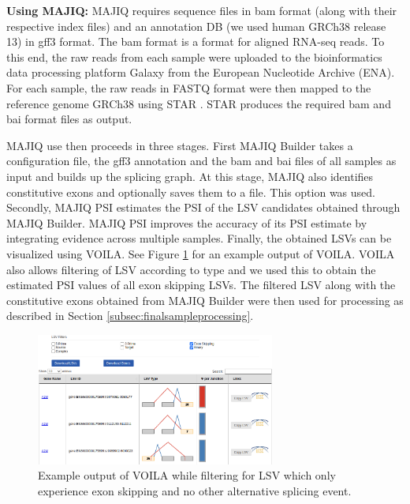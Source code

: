 \textbf{Using MAJIQ:} MAJIQ requires sequence files in bam format (along with their respective index files) and an annotation DB (we used human GRCh38 release 13) in gff3 format. The bam format is a format for aligned RNA-seq reads. 
To this end, the raw reads from each sample were uploaded to the bioinformatics data processing platform Galaxy \cite{galaxy} from the European Nucleotide Archive (ENA). For each sample, the raw reads in FASTQ format were then mapped to the reference genome GRCh38 \cite{hg38} using STAR \cite{star}. STAR produces the required bam and bai format files as output.

MAJIQ use then proceeds in three stages. First MAJIQ Builder takes a configuration file, the gff3 annotation and the bam and bai files of all samples as input and builds up the splicing graph. At this stage, MAJIQ also identifies constitutive exons and optionally saves them to a file. This option was used.
Secondly, MAJIQ PSI estimates the PSI of the LSV candidates obtained through MAJIQ Builder. MAJIQ PSI improves the accuracy of its PSI estimate by integrating evidence across multiple samples.
Finally, the obtained LSVs can be visualized using VOILA. See Figure \ref{fig:voilaexample} for an example output of VOILA. VOILA also allows filtering of LSV according to type and we used this to obtain the estimated PSI values of all exon skipping LSVs. The filtered LSV along with the constitutive exons obtained from MAJIQ Builder were then used for processing as described in Section \ref{subsec:finalsampleprocessing}.\\


\begin{figure}
	\centering\includegraphics[width=0.7\textwidth]{../visualizations/ch4-methods/voila_example.png} 
	\caption[Four-chamber illustration of the human heart.]{Example output of VOILA while filtering for LSV which only experience exon skipping and no other alternative splicing event. }
	\label{fig:voilaexample}
\end{figure}


